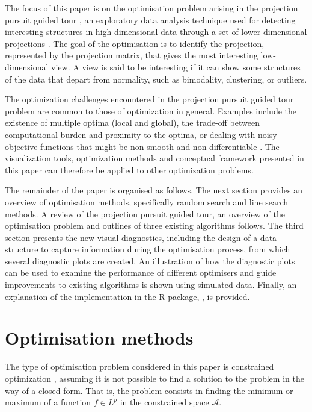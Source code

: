 The focus of this paper is on the optimisation problem arising in the
projection pursuit guided tour \citep{buja2005computational}, an
exploratory data analysis technique used for detecting interesting
structures in high-dimensional data through a set of lower-dimensional
projections \citep{cook2008grand}. The goal of the optimisation is to
identify the projection, represented by the projection matrix, that
gives the most interesting low-dimensional view. A view is said to be
interesting if it can show some structures of the data that depart from
normality, such as bimodality, clustering, or outliers.

The optimization challenges encountered in the projection pursuit guided
tour problem are common to those of optimization in general. Examples
include the existence of multiple optima (local and global), the
trade-off between computational burden and proximity to the optima, or
dealing with noisy objective functions that might be non-smooth and
non-differentiable \citep{jones1998efficient}. The visualization tools,
optimization methods and conceptual framework presented in this paper
can therefore be applied to other optimization problems.

The remainder of the paper is organised as follows. The next section
provides an overview of optimisation methods, specifically random search
and line search methods. A review of the projection pursuit guided tour,
an overview of the optimisation problem and outlines of three existing
algorithms follows. The third section presents the new visual
diagnostics, including the design of a data structure to capture
information during the optimisation process, from which several
diagnostic plots are created. An illustration of how the diagnostic
plots can be used to examine the performance of different optimisers and
guide improvements to existing algorithms is shown using simulated data.
Finally, an explanation of the implementation in the R package,
 \citep{ferrn}, is provided.

\hypertarget{optim}{%
\section{Optimisation methods}\label{optim}}

The type of optimisation problem considered in this paper is constrained
optimization \citep{bertsekas2014constrained}, assuming it is not
possible to find a solution to the problem in the way of a closed-form.
That is, the problem consists in finding the minimum or maximum of a
function \(f \in L^p\) in the constrained space \(\mathcal{A}\).

